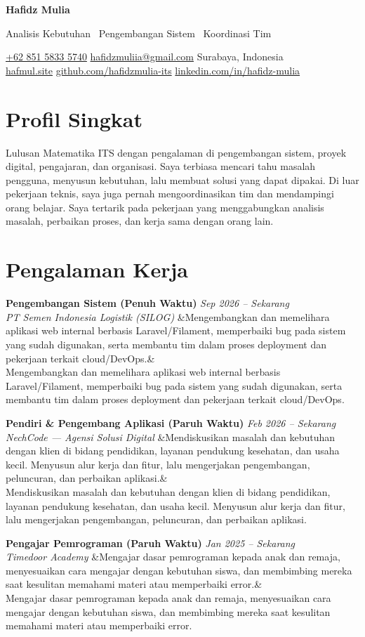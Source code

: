 \documentclass[a4paper,11pt]{article}
\newcommand{\cvname}[1]{%
  {\centering\LARGE\bfseries #1\par\vspace{2pt}}%
}
\newcommand{\cvtitle}[1]{%
  {\centering\large\color{accent} #1\par\vspace{4pt}}%
}
\newcommand{\cvcontact}[1]{%
  {\centering\small #1\par\vspace{10pt}}%
}
\newcommand{\cventry}[4]{%
  \noindent\textbf{#1} \hfill \textit{#3} \\
  \textit{#2}
  \ifx&#4& \else \\ \small #4 \fi
  \vspace{10pt}
}
\begin{document}
\cvname{Hafidz Mulia}
\cvtitle{Analisis Kebutuhan \textbar\ Pengembangan Sistem \textbar\ Koordinasi Tim}
\cvcontact{%
  \href{tel:+6285158335740}{+62 851 5833 5740} \quad\textbar\quad
  \href{mailto:hafidzmuliia@gmail.com}{hafidzmuliia@gmail.com} \quad\textbar\quad
  Surabaya, Indonesia \\
  \href{https://hafmul.site}{hafmul.site} \quad\textbar\quad
  \href{https://github.com/hafidzmulia-its}{github.com/hafidzmulia-its} \quad\textbar\quad
  \href{https://www.linkedin.com/in/hafidz-mulia/}{linkedin.com/in/hafidz-mulia}
}

\section{Profil Singkat}
Lulusan Matematika ITS dengan pengalaman di pengembangan sistem, proyek digital, pengajaran, dan organisasi. Saya terbiasa mencari tahu masalah pengguna, menyusun kebutuhan, lalu membuat solusi yang dapat dipakai. Di luar pekerjaan teknis, saya juga pernah mengoordinasikan tim dan mendampingi orang belajar. Saya tertarik pada pekerjaan yang menggabungkan analisis masalah, perbaikan proses, dan kerja sama dengan orang lain.

\section{Pengalaman Kerja}

\cventry
  {Pengembangan Sistem (Penuh Waktu)}
  {PT Semen Indonesia Logistik (SILOG)}
  {Sep 2026 -- Sekarang}
  {Mengembangkan dan memelihara aplikasi web internal berbasis Laravel/Filament, memperbaiki bug pada sistem yang sudah digunakan, serta membantu tim dalam proses deployment dan pekerjaan terkait cloud/DevOps.}

\cventry
  {Pendiri \& Pengembang Aplikasi (Paruh Waktu)}
  {NechCode --- Agensi Solusi Digital}
  {Feb 2026 -- Sekarang}
  {Mendiskusikan masalah dan kebutuhan dengan klien di bidang pendidikan, layanan pendukung kesehatan, dan usaha kecil. Menyusun alur kerja dan fitur, lalu mengerjakan pengembangan, peluncuran, dan perbaikan aplikasi.}

\cventry
  {Pengajar Pemrograman (Paruh Waktu)}
  {Timedoor Academy}
  {Jan 2025 -- Sekarang}
  {Mengajar dasar pemrograman kepada anak dan remaja, menyesuaikan cara mengajar dengan kebutuhan siswa, dan membimbing mereka saat kesulitan memahami materi atau memperbaiki error.}
\end{document}
